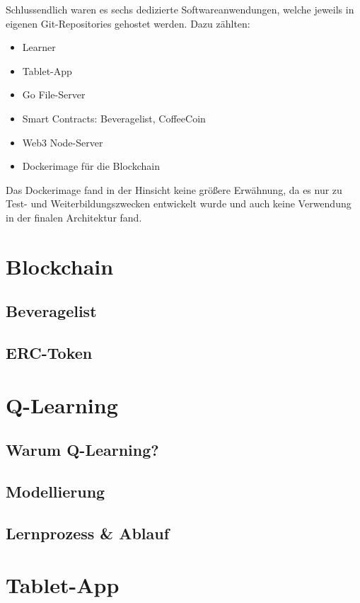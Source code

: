Schlussendlich waren es sechs dedizierte Softwareanwendungen, welche jeweils in eigenen Git-Repositories gehostet werden. 
Dazu zählten:
\begin{itemize}
	\item Learner
	\item Tablet-App
	\item Go File-Server
	\item Smart Contracts: Beveragelist, CoffeeCoin
	\item Web3 Node-Server
	\item Dockerimage für die Blockchain
\end{itemize} 
Das Dockerimage fand in der Hinsicht keine größere Erwähnung, da es nur zu Test- und Weiterbildungszwecken entwickelt wurde und auch keine Verwendung in der finalen Architektur fand.


\section{Blockchain}
\subsection{Beveragelist}
\subsection{ERC-Token}

\section{Q-Learning}
\subsection{Warum Q-Learning?}
\subsection{Modellierung}
\subsection{Lernprozess \& Ablauf}

\section{Tablet-App}


